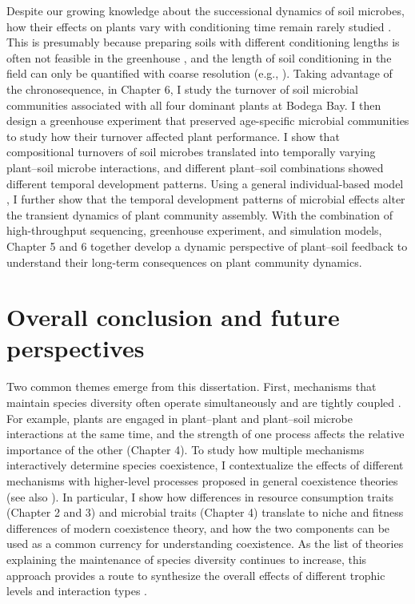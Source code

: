Despite our growing knowledge about the successional dynamics of soil microbes, how their effects on plants vary with conditioning time remain rarely studied \citep{Kardol2013, Lepinay2018}. This is presumably because preparing soils with different conditioning lengths is often not feasible in the greenhouse \citep{Kardol2013, Kulmatiski2018}, and the length of soil conditioning in the field can only be quantified with coarse resolution (e.g., \citealp{Day2015, Speek2015}). 
Taking advantage of the chronosequence, in Chapter 6, I study the turnover of soil microbial communities associated with all four dominant plants at Bodega Bay. I then design a greenhouse experiment that preserved age-specific microbial communities to study how their turnover affected plant performance.
I show that compositional turnovers of soil microbes translated into temporally varying plant--soil microbe interactions, and different plant--soil combinations showed different temporal development patterns. 
Using a general individual-based model \citep{Fukami2013}, I further show that the temporal development patterns of microbial effects alter the transient dynamics of plant community assembly. 
With the combination of high-throughput sequencing, greenhouse experiment, and simulation models, Chapter 5 and 6 together develop a dynamic perspective of plant--soil feedback to understand their long-term consequences on plant community dynamics.
\par


\section{Overall conclusion and future perspectives}
Two common themes emerge from this dissertation. First, mechanisms that maintain species diversity often operate simultaneously and are tightly coupled \citep{Amarasekare2007, Letten2018}. For example, plants are engaged in plant--plant and plant--soil microbe interactions at the same time, and the strength of one process affects the relative importance of the other (Chapter 4). To study how multiple mechanisms interactively determine species coexistence, I contextualize the effects of different mechanisms with higher-level processes proposed in general coexistence theories (see also \citealp{Vellend2016}). In particular, I show how differences in resource consumption traits (Chapter 2 and 3) and microbial traits (Chapter 4) translate to niche and fitness differences of modern coexistence theory, and how the two components can be used as a common currency for understanding coexistence. As the list of theories explaining the maintenance of species diversity continues to increase, this approach provides a route to synthesize the overall effects of different trophic levels and interaction types \citep{Bartomeus2018, Lanuza2018}.
\par


